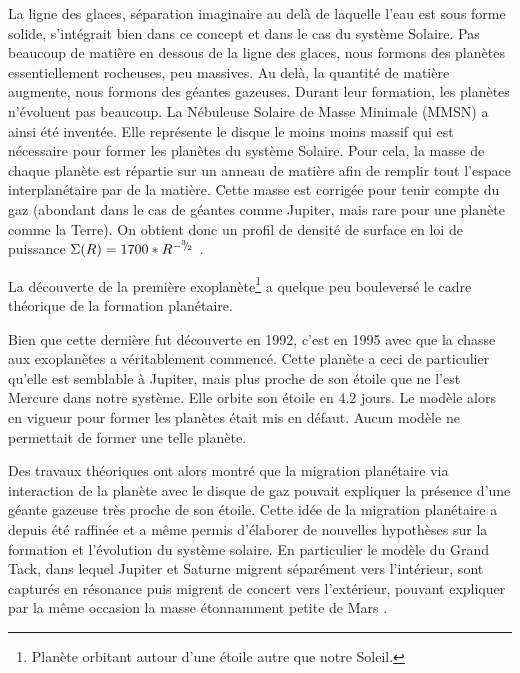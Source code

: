 La ligne des glaces, séparation imaginaire au delà de laquelle l'eau est sous forme solide, s'intégrait bien dans ce concept et dans le cas du système Solaire. Pas beaucoup de matière en dessous de la ligne des glaces, nous formons des planètes essentiellement rocheuses, peu massives. Au delà, la quantité de matière augmente, nous formons des géantes gazeuses. Durant leur formation, les planètes n'évoluent pas beaucoup. La Nébuleuse Solaire de Masse Minimale (MMSN) a ainsi été inventée. Elle représente le disque le moins moins massif qui est nécessaire pour former les planètes du système Solaire. Pour cela, la masse de chaque planète est répartie sur un anneau de matière afin de remplir tout l'espace interplanétaire par de la matière. Cette masse est corrigée pour tenir compte du gaz (abondant dans le cas de géantes comme Jupiter, mais rare pour une planète comme la Terre). On obtient donc un profil de densité de surface en loi de puissance $\Sigma(R)=1700 * R^{-{{}^{3\!\!}/ _{\!2}}}$ \citep{
weidenschilling1977distribution, hayashi1981structure}.

La découverte de la première exoplanète\footnote{Planète orbitant autour d'une étoile autre que notre Soleil.} \citep{wolszczan1992planetary} a quelque peu bouleversé le cadre théorique de la formation planétaire.

Bien que cette dernière fut découverte en 1992, c'est en 1995 avec  \citep{mayor1995jupiter} que la chasse aux exoplanètes a véritablement commencé. Cette planète a ceci de particulier qu'elle est semblable à Jupiter, mais plus proche de son étoile que ne l'est Mercure dans notre système. Elle orbite son étoile en $4.2$ jours. Le modèle alors en vigueur pour former les planètes était mis en défaut. Aucun modèle ne permettait de former une telle planète. 

Des travaux théoriques ont alors montré que la migration planétaire via interaction de la planète avec le disque de gaz pouvait expliquer la présence d'une géante gazeuse très proche de son étoile. Cette idée de la migration planétaire a depuis été raffinée et a même permis d'élaborer de nouvelles hypothèses sur la formation et l'évolution du système solaire. En particulier le modèle du \og Grand Tack\fg \citep{morbidelli2007dynamics, pierens2011twophase}, dans lequel Jupiter et Saturne migrent séparément vers l'intérieur, sont capturés en résonance puis migrent de concert vers l'extérieur, pouvant expliquer par la même occasion la masse étonnamment petite de Mars \citep{walsh2011low}. 

